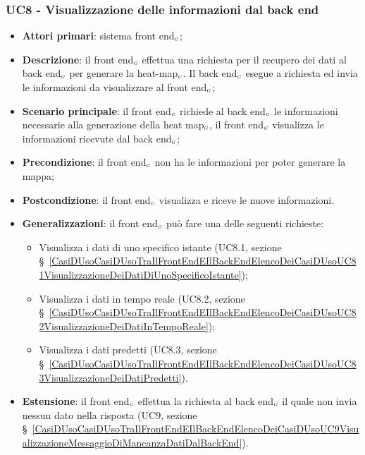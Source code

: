\subsubsection{UC8 - Visualizzazione delle informazioni dal back end}\label{CasiDUsoCasiDUsoTraIlFrontEndEIlBackEndElencoDeiCasiDUsoUC8VisualizzazioneDelleInformazioniDalBackEnd}

\begin{itemize}
	\item \textbf{Attori primari}: sistema front end$_{\scaleto{G}{3pt}}$;
	\item \textbf{Descrizione}: il front end$_{\scaleto{G}{3pt}}$ effettua una richiesta per il recupero dei dati al back end$_{\scaleto{G}{3pt}}$ per generare la heat-map$_{\scaleto{G}{3pt}}$. Il back end$_{\scaleto{G}{3pt}}$ esegue a richiesta ed invia le informazioni da visualizzare al front end$_{\scaleto{G}{3pt}}$;
	\item \textbf{Scenario principale}: il front end$_{\scaleto{G}{3pt}}$ richiede al back end$_{\scaleto{G}{3pt}}$ le informazioni necessarie alla generazione della heat map$_{\scaleto{G}{3pt}}$, il front end$_{\scaleto{G}{3pt}}$ visualizza le informazioni ricevute dal back end$_{\scaleto{G}{3pt}}$;
	\item \textbf{Precondizione}: il front end$_{\scaleto{G}{3pt}}$ non ha le informazioni per poter generare la mappa;
	\item \textbf{Postcondizione}: il front end$_{\scaleto{G}{3pt}}$ visualizza e riceve le nuove informazioni.
	\item \textbf{Generalizzazioni}: il front end$_{\scaleto{G}{3pt}}$ può fare una delle seguenti richieste:
	\begin{itemize}
		\item Visualizza i dati di uno specifico istante (UC8.1, sezione \S~\ref{CasiDUsoCasiDUsoTraIlFrontEndEIlBackEndElencoDeiCasiDUsoUC81VisualizzazioneDeiDatiDiUnoSpecificoIstante});
		\item Visualizza i dati in tempo reale (UC8.2, sezione  \S~\ref{CasiDUsoCasiDUsoTraIlFrontEndEIlBackEndElencoDeiCasiDUsoUC82VisualizzazioneDeiDatiInTempoReale});
		\item Visualizza i dati predetti (UC8.3, sezione  \S~\ref{CasiDUsoCasiDUsoTraIlFrontEndEIlBackEndElencoDeiCasiDUsoUC83VisualizzazioneDeiDatiPredetti}).
	\end{itemize}
	\item \textbf{Estensione}: il front end$_{\scaleto{G}{3pt}}$ effettua la richiesta al back end$_{\scaleto{G}{3pt}}$ il quale non invia nessun dato nella risposta (UC9, sezione \S~\ref{CasiDUsoCasiDUsoTraIlFrontEndEIlBackEndElencoDeiCasiDUsoUC9VisualizzazioneMessaggioDiMancanzaDatiDalBackEnd}).
\end{itemize}


